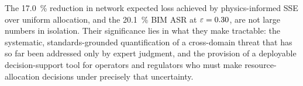 The \SI{17.0}{\percent} reduction in network expected loss achieved
by physics-informed SSE over uniform allocation, and the \SI{20.1}{\percent}
\ac{BIM} \acs{ASR} at $\varepsilon = 0.30$, are not large numbers in
isolation.  Their significance lies in what they make tractable:
the systematic, standards-grounded quantification of a cross-domain
threat that has so far been addressed only by expert judgment, and
the provision of a deployable decision-support tool for operators
and regulators who must make resource-allocation decisions under
precisely that uncertainty.
